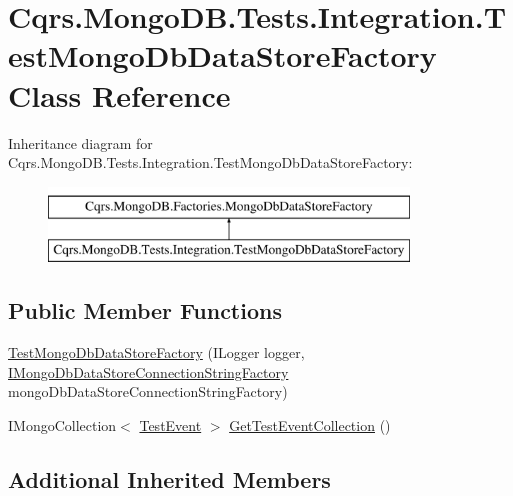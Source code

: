 \hypertarget{classCqrs_1_1MongoDB_1_1Tests_1_1Integration_1_1TestMongoDbDataStoreFactory}{}\section{Cqrs.\+Mongo\+D\+B.\+Tests.\+Integration.\+Test\+Mongo\+Db\+Data\+Store\+Factory Class Reference}
\label{classCqrs_1_1MongoDB_1_1Tests_1_1Integration_1_1TestMongoDbDataStoreFactory}
Inheritance diagram for Cqrs.\+Mongo\+D\+B.\+Tests.\+Integration.\+Test\+Mongo\+Db\+Data\+Store\+Factory\+:\begin{figure}[H]
\begin{center}
\leavevmode
\includegraphics[height=2.000000cm]{classCqrs_1_1MongoDB_1_1Tests_1_1Integration_1_1TestMongoDbDataStoreFactory}
\end{center}
\end{figure}
\subsection*{Public Member Functions}
\begin{DoxyCompactItemize}
\item 
\hyperlink{classCqrs_1_1MongoDB_1_1Tests_1_1Integration_1_1TestMongoDbDataStoreFactory_abb427efd7fcd28548fd02d09a2901994}{Test\+Mongo\+Db\+Data\+Store\+Factory} (I\+Logger logger, \hyperlink{interfaceCqrs_1_1MongoDB_1_1Factories_1_1IMongoDbDataStoreConnectionStringFactory}{I\+Mongo\+Db\+Data\+Store\+Connection\+String\+Factory} mongo\+Db\+Data\+Store\+Connection\+String\+Factory)
\item 
I\+Mongo\+Collection$<$ \hyperlink{classCqrs_1_1Azure_1_1ServiceBus_1_1Tests_1_1Unit_1_1TestEvent}{Test\+Event} $>$ \hyperlink{classCqrs_1_1MongoDB_1_1Tests_1_1Integration_1_1TestMongoDbDataStoreFactory_a65d996d53f32b1a40121052193b582fa}{Get\+Test\+Event\+Collection} ()
\end{DoxyCompactItemize}
\subsection*{Additional Inherited Members}



